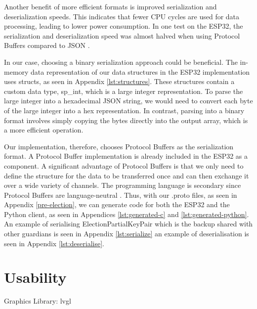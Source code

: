 Another benefit of more efficient formats is improved serialization and deserialization speeds. This indicates that fewer CPU cycles are used for data processing, leading to lower power consumption. In one test on the ESP32, the serialization and deserialization speed was almost halved when using Protocol Buffers compared to JSON \cite[11-12]{serialisation-comparison}. 

In our case, choosing a binary serialization approach could be beneficial. The in-memory data representation of our data structures in the ESP32 implementation uses structs, as seen in Appendix \ref{lst:structures}. These structures contain a custom data type, sp_int, which is a large integer representation. To parse the large integer into a hexadecimal JSON string, we would need to convert each byte of the large integer into a hex representation. In contrast, parsing into a binary format involves simply copying the bytes directly into the output array, which is a more efficient operation.

Our implementation, therefore, chooses Protocol Buffers as the serialization format. A Protocol Buffer implementation is already included in the ESP32 as a component. A significant advantage of Protocol Buffers is that we only need to define the structure for the data to be transferred once and can then exchange it over a wide variety of channels. The programming language is secondary since Protocol Buffers are language-neutral \cite[224]{proto}. Thus, with our .proto files, as seen in Appendix \ref{pre-election}, we can generate code for both the ESP32 and the Python client, as seen in Appendices \ref{lst:generated-c} and \ref{lst:generated-python}. An example of serialising ElectionPartialKeyPair which is the backup shared with other guardians is seen in Appendix \ref{lst:serialize} an example of deserialisation is seen in Appendix \ref{lst:deserialise}. 

\section{Usability}

Graphics Library: lvgl

\nocite{*}

